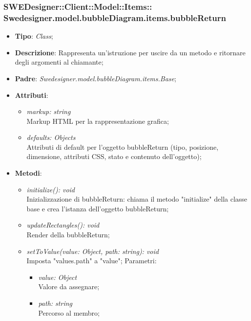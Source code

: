 \documentclass[../DefinizioneDiProdotto.tex]{subfiles}
\begin{document}
			\subsubsection[Swedesigner.model.bubbleDiagram.items.bubbleReturn]{SWEDesigner::Client::Model::Items::\\Swedesigner.model.bubbleDiagram.items.bubbleReturn}
			\hypertarget{SWEDesigner::Client::Model::Items::Swedesigner.model.bubbleDiagram.items.bubbleReturn}{}
			\begin{itemize}
				\item \textbf{Tipo}: \emph{Class};
				\item \textbf{Descrizione}: Rappresenta un'istruzione per uscire da un metodo e ritornare degli argomenti al chiamante;
				\item \textbf{Padre}: \emph{Swedesigner.model.bubbleDiagram.items.Base};
				\item \textbf{Attributi}:
				\begin{itemize}
					\item \emph{markup: string}\\
					Markup HTML per la rappresentazione grafica;
					\item \emph{defaults: Objects}\\
					Attributi di default per l'oggetto bubbleReturn (tipo, posizione, dimensione, attributi CSS, stato e contenuto dell'oggetto);
				\end{itemize}
				\item \textbf{Metodi}:
				\begin{itemize}
					\item \emph{initialize(): void}\\
					Inizializzazione di bubbleReturn: chiama il metodo "initialize" della classe base e crea l'istanza dell'oggetto bubbleReturn;
					\item \emph{updateRectangles(): void}\\
					Render della bubbleReturn;
					\item \emph{setToValue(value: Object, path: string): void}\\
					Imposta "values.path" a "value";
					Parametri:
					\begin{itemize}
						\item \emph{value: Object} \\
						Valore da assegnare;
						\item \emph{path: string} \\
						Percorso al membro;
					\end{itemize}
				\end{itemize}
			\end{itemize}
			
\end{document}
